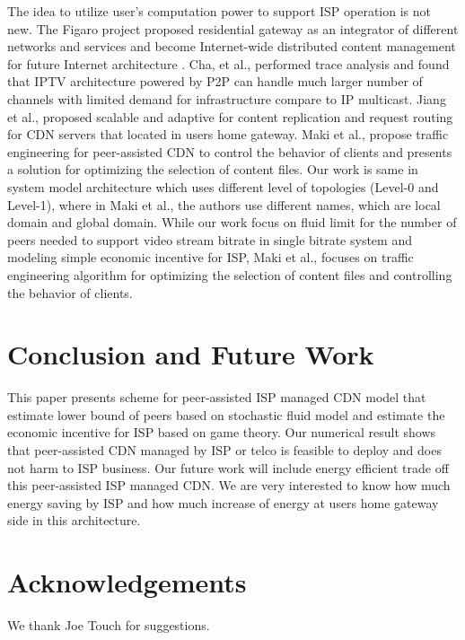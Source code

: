 \documentclass[paper]{ieice}
\begin{document}
The idea to utilize user's computation power to support ISP operation is not new.  
The Figaro project \cite{figaro} proposed residential gateway as an integrator of different networks and services and become Internet-wide distributed content management for future Internet architecture \cite{figaro}. 
Cha, et al.,\cite{Cha:2008:NTP:1855641.1855646} performed trace analysis and found that IPTV architecture powered by P2P can handle much larger number of channels with limited demand for infrastructure compare to IP multicast. 
Jiang et al., \cite{Jiang:2012:OMD:2413176.2413193} proposed scalable and adaptive for content replication and request routing for CDN servers that located in users home gateway. 
Maki et al.,\cite{NaoyaMAKI2012} propose traffic engineering for peer-assisted CDN to control the behavior of clients and presents a solution for optimizing the selection of content files.
Our work is same in system model architecture which uses different level of topologies  (Level-0 and Level-1), where in Maki et al., \cite{NaoyaMAKI2012} the authors use different names, which are local domain and global domain. 
While our work focus on fluid limit for the number of peers needed to support video stream bitrate in single bitrate system and modeling simple economic incentive for ISP, Maki et al., \cite{NaoyaMAKI2012} focuses on traffic engineering algorithm for optimizing the selection of content files and controlling the behavior of clients.

\section{Conclusion and Future Work}\label{conclude}
This paper presents scheme for peer-assisted ISP managed CDN model that estimate lower bound of peers based on stochastic fluid model and estimate the economic incentive for ISP based on game theory.  
Our numerical result shows that peer-assisted CDN managed by ISP or telco is feasible to deploy and does not harm to ISP business. 
Our future work will include energy efficient trade off this peer-assisted ISP managed CDN. 
We are very interested to know how much energy saving by ISP and how much increase of energy at users home gateway side in this architecture. 





\section*{Acknowledgements}
We thank Joe Touch for suggestions.
\end{document}
